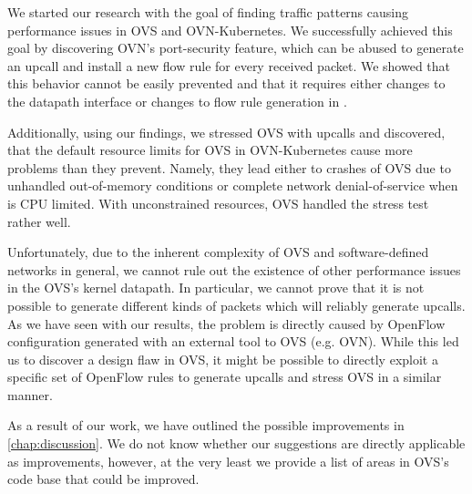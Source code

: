 

We started our research with the goal of finding traffic patterns causing performance issues in OVS and OVN-Kubernetes. We successfully achieved this goal by discovering OVN's port-security feature, which can be abused to generate an upcall and install a new flow rule for every received packet. We showed that this behavior cannot be easily prevented and that it requires either changes to the datapath interface or changes to flow rule generation in .

Additionally, using our findings, we stressed OVS with upcalls and discovered, that the default resource limits for OVS in OVN-Kubernetes cause more problems than they prevent. Namely, they lead either to crashes of OVS due to unhandled out-of-memory conditions or complete network denial-of-service when  is CPU limited. With unconstrained resources, OVS handled the stress test rather well.

Unfortunately, due to the inherent complexity of OVS and software-defined networks in general, we cannot rule out the existence of other performance issues in the OVS's kernel datapath. In particular, we cannot prove that it is not possible to generate different kinds of packets which will reliably generate upcalls. As we have seen with our results, the problem is directly caused by OpenFlow configuration generated with an external tool to OVS (e.g. OVN). While this led us to discover a design flaw in OVS, it might be possible to directly exploit a specific set of OpenFlow rules to generate upcalls and stress OVS in a similar manner.

As a result of our work, we have outlined the possible improvements in \cref{chap:discussion}. We do not know whether our suggestions are directly applicable as improvements, however, at the very least we provide a list of areas in OVS's code base that could be improved.

